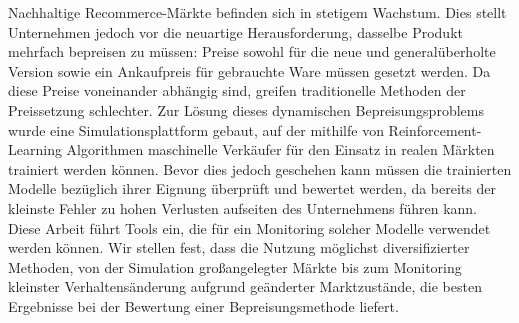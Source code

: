 Nachhaltige Recommerce-Märkte befinden sich in stetigem Wachstum. Dies stellt Unternehmen jedoch vor die neuartige Herausforderung, dasselbe Produkt mehrfach bepreisen zu müssen: Preise sowohl für die neue und generalüberholte Version sowie ein Ankaufpreis für gebrauchte Ware müssen gesetzt werden. Da diese Preise voneinander abhängig sind, greifen traditionelle Methoden der Preissetzung schlechter. Zur Lösung dieses dynamischen Bepreisungsproblems wurde eine Simulationsplattform gebaut, auf der mithilfe von Reinforcement-Learning Algorithmen maschinelle Verkäufer für den Einsatz in realen Märkten trainiert werden können. Bevor dies jedoch geschehen kann müssen die trainierten Modelle bezüglich ihrer Eignung überprüft und bewertet werden, da bereits der kleinste Fehler zu hohen Verlusten aufseiten des Unternehmens führen kann. Diese Arbeit führt Tools ein, die für ein Monitoring solcher Modelle verwendet werden können. Wir stellen fest, dass die Nutzung möglichst diversifizierter Methoden, von der Simulation großangelegter Märkte bis zum Monitoring kleinster Verhaltensänderung aufgrund geänderter Marktzustände, die besten Ergebnisse bei der Bewertung einer Bepreisungsmethode liefert.